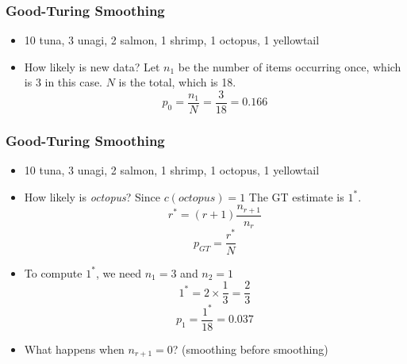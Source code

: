 \begin{frame}
\frametitle{Good-Turing Smoothing}
\begin{itemize}[<+->]
\item { \color{blue} 10} tuna,  { \color{blue} 3} unagi,  { \color{blue} 2} salmon,  { \color{blue} 1} shrimp,  { \color{blue} 1} octopus,  { \color{blue} 1} yellowtail
\item How likely is new data? Let $n_1$ be the number of items occurring once, which is {\color{blue} 3} in this case. $N$ is the total, which is {\color{blue} 18}.
\[ p_0 = \frac{n_1}{N} = \frac{3}{18} = 0.166 \]
\end{itemize}
\end{frame}

\begin{frame}
\frametitle{Good-Turing Smoothing}
\begin{itemize}[<+->]
\item { \color{blue} 10} tuna,  { \color{blue} 3} unagi,  { \color{blue} 2} salmon,  { \color{blue} 1} shrimp,  { \color{blue} 1} octopus,  { \color{blue} 1} yellowtail
\item How likely is {\em octopus}? Since $c(\textit{octopus}) = 1$ The GT estimate is $1^\ast$. 
{\color{blue} \[ r^\ast = (r+1) \frac{ n_{r+1} }{ n_r } \] }
{\color{blue} \[ p_{GT} = \frac{ r^\ast }{ N } \] }
\item To compute $1^\ast$, we need $n_1 = 3$ and $n_2 = 1$
\[ 1^\ast = 2 \times \frac{1}{3} = \frac{2}{3} \]
\[ p_1 = \frac{1^\ast}{18} = 0.037 \]
\item What happens when $n_{r+1} = 0$? (smoothing before smoothing)
\end{itemize}
\end{frame}

